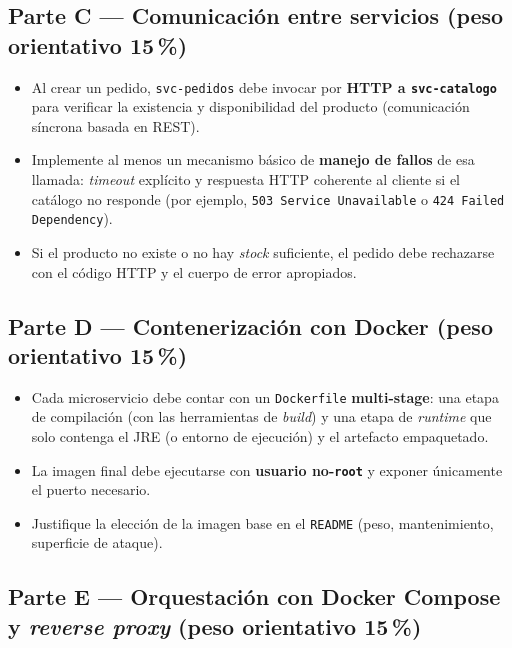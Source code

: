 \documentclass[11pt,a4paper]{article}
\begin{document}
\subsection*{Parte C --- Comunicación entre servicios (peso orientativo 15\,\%)}

\begin{itemize}[leftmargin=1.2em, itemsep=0.25em]
    \item Al crear un pedido, \texttt{svc-pedidos} debe invocar por \textbf{HTTP a \texttt{svc-catalogo}} para verificar la existencia y disponibilidad del producto (comunicación síncrona basada en REST).
    \item Implemente al menos un mecanismo básico de \textbf{manejo de fallos} de esa llamada: \emph{timeout} explícito y respuesta HTTP coherente al cliente si el catálogo no responde (por ejemplo, \texttt{503 Service Unavailable} o \texttt{424 Failed Dependency}).
    \item Si el producto no existe o no hay \emph{stock} suficiente, el pedido debe rechazarse con el código HTTP y el cuerpo de error apropiados.
\end{itemize}

\subsection*{Parte D --- Contenerización con Docker (peso orientativo 15\,\%)}

\begin{itemize}[leftmargin=1.2em, itemsep=0.25em]
    \item Cada microservicio debe contar con un \texttt{Dockerfile} \textbf{multi-stage}: una etapa de compilación (con las herramientas de \emph{build}) y una etapa de \emph{runtime} que solo contenga el JRE (o entorno de ejecución) y el artefacto empaquetado.
    \item La imagen final debe ejecutarse con \textbf{usuario no-\texttt{root}} y exponer únicamente el puerto necesario.
    \item Justifique la elección de la imagen base en el \texttt{README} (peso, mantenimiento, superficie de ataque).
\end{itemize}

\subsection*{Parte E --- Orquestación con Docker Compose y \emph{reverse proxy} (peso orientativo 15\,\%)}
\end{document}
